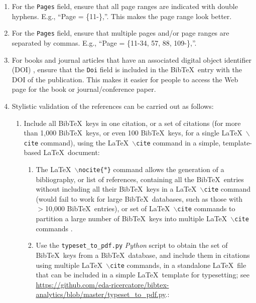 \documentclass[letter,12pt]{article}
\begin{document}
\begin{enumerate}
\item For the {\tt Pages} field, ensure that all page ranges are indicated with double hyphens. E.g., ``Page = \{11-\},''. This makes the page range look better.
\item For the {\tt Pages} field, ensure that multiple pages and/or page ranges are separated by commas. E.g., ``Page = \{11-34, 57, 88, 109-\},''.
\item For books and journal articles that have an associated digital object identifier (DOI) \cite{InternationalDOIFoundationStaff2017}, ensure that the {\tt Doi} field is included in the {\sc Bib}\TeX\ entry with the DOI of the publication. This makes it easier for people to access the Web page for the book or journal/conference paper.
\item Stylistic validation of the references can be carried out as follows: \vspace{-0.3cm}
	\begin{enumerate} \itemsep -2pt
	\item Include all {\sc Bib}\TeX\ keys in one citation, or a set of citations (for more than 1,000 {\sc Bib}\TeX\ keys, or even 100 {\sc Bib}\TeX\ keys, for a single \LaTeX\ {\tt $\backslash$cite} command), using the \LaTeX\ {\tt $\backslash$cite} command in a simple, template-based \LaTeX\ document: \vspace{-0.2cm}
		\begin{enumerate} \itemsep -2pt
		\item The \LaTeX\ {\tt $\backslash$nocite\{$\ast$\}} command allows the generation of a bibliography, or list of references, containing all the {\sc Bib}\TeX\ entries without including all their {\sc Bib}\TeX\ keys in a \LaTeX\ {\tt $\backslash$cite} command (would fail to work for large {\sc Bib}\TeX\ databases, such as those with $>$10,000 {\sc Bib}\TeX\ entries), or set of \LaTeX\ {\tt $\backslash$cite} commands to partition a large number of {\sc Bib}\TeX\ keys into multiple \LaTeX\ {\tt $\backslash$cite} commands \cite[in \S2 Citations: \S2.4 No cite]{WikibooksContributors2021a}.
		\item Use the {\tt typeset\_to\_pdf.py} {\it Python} script \cite{Ong2023a} to obtain the set of {\sc Bib}\TeX\ keys from a {\sc Bib}\TeX\ database, and include them in citations using multiple \LaTeX\ {\tt $\backslash$cite} commands, in a standalone \LaTeX\ file that can be included in a simple \LaTeX\ template for typesetting; see \url{https://github.com/eda-ricercatore/bibtex-analytics/blob/master/typeset_to_pdf.py}.: \vspace{-0.1cm}

\end{enumerate}
\end{enumerate}
\end{enumerate}
\end{document}
